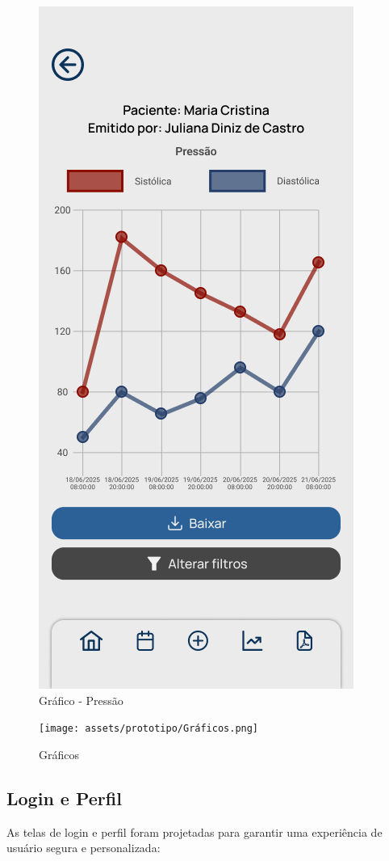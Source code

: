 \begin{figure}[!htbp]
	\centering
	\includegraphics[width=0.6\linewidth]{assets/prototipo/Gráfico - Pressão.png}
	\caption{Gráfico - Pressão}
	\label{grafico_pressao}
\end{figure}

\begin{figure}[!htbp]
	\centering
	\texttt{[image: assets/prototipo/Gráficos.png]}
	\caption{Gráficos}
	\label{graficos}
\end{figure}

\subsection{Login e Perfil}

As telas de login e perfil foram projetadas para garantir uma experiência de usuário segura e personalizada:

